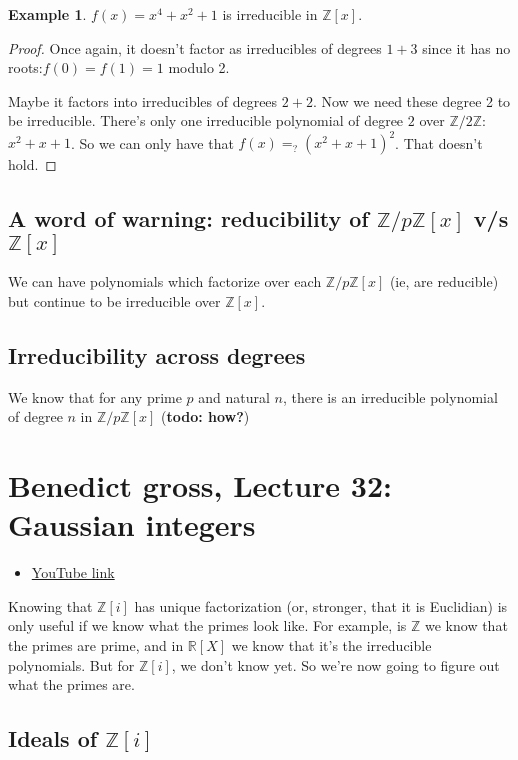 \documentclass{book}
\newcommand{\Z}{\ensuremath{\mathbb{Z}}}
\newcommand{\R}{\ensuremath{\mathbb{R}}}
\theoremstyle{definition}
\newtheorem{example}[theorem]{Example}
\begin{document}
\begin{example}
    $f(x) = x^4 + x^2 + 1$ is irreducible in $\Z[x]$.
\end{example}
\begin{proof}
    Once again, it doesn't factor as irreducibles of degrees $1 + 3$ since it has
    no roots:$f(0) = f(1) = 1$ modulo 2.

    Maybe it factors into irreducibles of degrees $2 + 2$.
    Now we need these degree 2 to be irreducible. There's only one
    irreducible polynomial of degree $2$ over $\Z/2\Z$: $x^2 + x + 1$.
    So we can only have that $f(x) =_? (x^2 + x + 1)^2$. That doesn't hold.
\end{proof}

\section{A word of warning: reducibility of $\Z/p\Z[x]$ v/s $\Z[x]$}

We can have polynomials which factorize over each $\Z/p\Z[x]$ (ie, are reducible)
but continue to be irreducible over $\Z[x]$.

\section{Irreducibility across degrees}

We know that for any prime $p$ and natural $n$, there is an irreducible
polynomial of degree $n$ in $\Z/p\Z[x]$ (\textbf{todo: how?})

\chapter{Benedict gross, Lecture 32: Gaussian integers}
\begin{itemize}
    \item \href{https://www.youtube.com/watch?v=Ln6IgLksDxE&list=PLelIK3uylPMGzHBuR3hLMHrYfMqWWsmx5&index=32}{YouTube link}
\end{itemize}

Knowing that $\Z[i]$ has unique factorization (or, stronger, that it is Euclidian)
is only useful if we know what the primes look like. For example, is $\Z$
we know that the primes are prime, and in $\R[X]$ we know that it's the 
irreducible polynomials. But for $\Z[i]$, we don't know yet. So we're now
going to figure out what the primes are.

\section{Ideals of $\Z[i]$}
\end{document}
